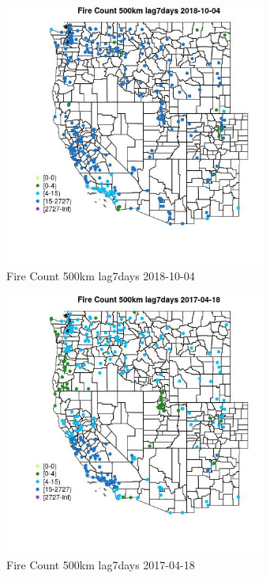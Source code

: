 \begin{figure} 
\centering  
\includegraphics[width=0.77\textwidth]{Code_Outputs/Report_ML_input_PM25_Step4_part_f_de_duplicated_aveswNAs_MapObsFire_Count_500km_lag7days2018-10-04.jpg} 
\caption{\label{fig:Report_ML_input_PM25_Step4_part_f_de_duplicated_aveswNAsMapObsFire_Count_500km_lag7days2018-10-04}Fire Count 500km lag7days 2018-10-04} 
\end{figure} 
 

\begin{figure} 
\centering  
\includegraphics[width=0.77\textwidth]{Code_Outputs/Report_ML_input_PM25_Step4_part_f_de_duplicated_aveswNAs_MapObsFire_Count_500km_lag7days2017-04-18.jpg} 
\caption{\label{fig:Report_ML_input_PM25_Step4_part_f_de_duplicated_aveswNAsMapObsFire_Count_500km_lag7days2017-04-18}Fire Count 500km lag7days 2017-04-18} 
\end{figure} 
 


